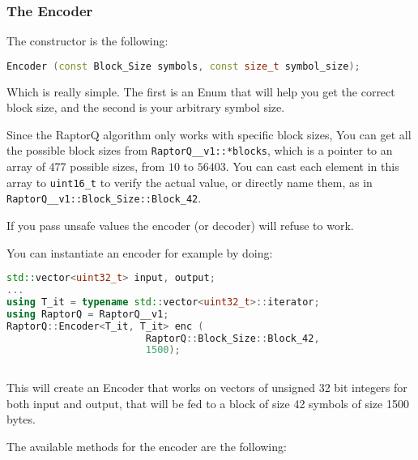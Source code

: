 \documentclass[11pt,a4paper]{refart}
\begin{document}
\newpage
\subsubsection{The Encoder}
The constructor is the following:
\begin{lstlisting}[language=C++]
Encoder (const Block_Size symbols, const size_t symbol_size);
\end{lstlisting}

Which is really simple. The first is an Enum that will help you get the correct block size, and the second is your arbitrary symbol size.

Since the RaptorQ algorithm only works with specific block sizes, You can get all the possible block sizes from \texttt{RaptorQ\_\_v1::*blocks}, which is a pointer to an array of 477 possible sizes, from $10$ to $56403$. You can cast each element in this array to \texttt{uint16\_t} to verify the actual value, or directly name them, as in \texttt{RaptorQ\_\_v1::Block\_Size::Block\_42}.

If you pass unsafe values the encoder (or decoder) will refuse to work.

You can instantiate an encoder for example by doing:

\begin{lstlisting}[language=C++]
std::vector<uint32_t> input, output;
...
using T_it = typename std::vector<uint32_t>::iterator;
using RaptorQ = RaptorQ__v1;
RaptorQ::Encoder<T_it, T_it> enc (
						RaptorQ::Block_Size::Block_42,					
						1500);
														
\end{lstlisting}

This will create an Encoder that works on vectors of unsigned 32 bit integers for both input and output, that will be fed to a block of size 42 
symbols of size 1500 bytes.

The available methods for the encoder are the following:
\end{document}
